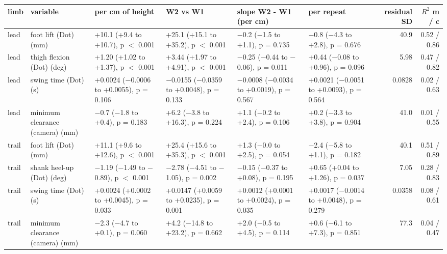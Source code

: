 \begin{adjustbox}{max width=\textwidth}
{\scriptsize
\begin{tabular}{llp{2.5cm}p{2.5cm}p{2.5cm}p{2.5cm}rr}
\toprule
\textbf{limb} & \textbf{variable} & \textbf{per cm of height} & \textbf{W2 vs W1} & \textbf{slope W2 - W1 (per cm)} & \textbf{per repeat} & \textbf{residual SD} & \textbf{$R^2$ m / c} \\
\midrule
lead & foot lift (Dot) (mm) & +10.1 (+9.4 to +10.7), p $<$ 0.001 & +25.1 (+15.1 to +35.2), p $<$ 0.001 & $-$0.2 ($-$1.5 to +1.1), p = 0.735 & $-$0.8 ($-$4.3 to +2.8), p = 0.676 & 40.9 & 0.52 / 0.86 \\
lead & thigh flexion (Dot) (deg) & +1.20 (+1.02 to +1.37), p $<$ 0.001 & +3.44 (+1.97 to +4.91), p $<$ 0.001 & $-$0.25 ($-$0.44 to $-$0.06), p = 0.011 & +0.44 ($-$0.08 to +0.96), p = 0.096 & 5.98 & 0.47 / 0.82 \\
lead & swing time (Dot) (s) & +0.0024 ($-$0.0006 to +0.0055), p = 0.106 & $-$0.0155 ($-$0.0359 to +0.0048), p = 0.133 & $-$0.0008 ($-$0.0034 to +0.0019), p = 0.567 & +0.0021 ($-$0.0051 to +0.0093), p = 0.564 & 0.0828 & 0.02 / 0.63 \\
lead & minimum clearance (camera) (mm) & $-$0.7 ($-$1.8 to +0.4), p = 0.183 & +6.2 ($-$3.8 to +16.3), p = 0.224 & +1.1 ($-$0.2 to +2.4), p = 0.106 & +0.2 ($-$3.3 to +3.8), p = 0.904 & 41.0 & 0.01 / 0.55 \\
trail & foot lift (Dot) (mm) & +11.1 (+9.6 to +12.6), p $<$ 0.001 & +25.4 (+15.6 to +35.3), p $<$ 0.001 & +1.3 ($-$0.0 to +2.5), p = 0.054 & $-$2.4 ($-$5.8 to +1.1), p = 0.182 & 40.1 & 0.51 / 0.89 \\
trail & shank heel-up (Dot) (deg) & $-$1.19 ($-$1.49 to $-$0.89), p $<$ 0.001 & $-$2.78 ($-$4.51 to $-$1.05), p = 0.002 & $-$0.15 ($-$0.37 to +0.08), p = 0.195 & +0.65 (+0.04 to +1.26), p = 0.037 & 7.05 & 0.28 / 0.83 \\
trail & swing time (Dot) (s) & +0.0024 (+0.0002 to +0.0045), p = 0.033 & +0.0147 (+0.0059 to +0.0235), p = 0.001 & +0.0012 (+0.0001 to +0.0024), p = 0.035 & +0.0017 ($-$0.0014 to +0.0048), p = 0.279 & 0.0358 & 0.08 / 0.61 \\
trail & minimum clearance (camera) (mm) & $-$2.3 ($-$4.7 to +0.1), p = 0.060 & +4.2 ($-$14.8 to +23.2), p = 0.662 & +2.0 ($-$0.5 to +4.5), p = 0.114 & +0.6 ($-$6.1 to +7.3), p = 0.851 & 77.3 & 0.04 / 0.47 \\
\bottomrule
\end{tabular}
}
\end{adjustbox}
